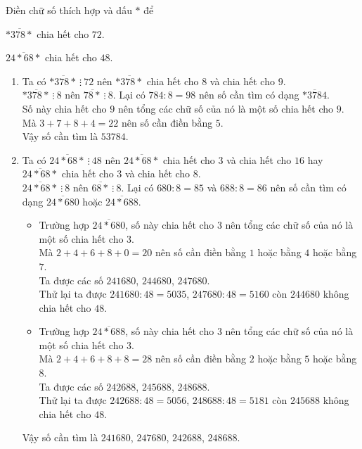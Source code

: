\begin{bt}%
 Điền chữ số thích hợp và dấu $*$ để
 \begin{enumEX}{2}
  \item $\overline{*378*}$ chia hết cho $72$.
  \item $\overline{24*68*}$ chia hết cho $48$.
 \end{enumEX}
 \loigiai
  {
  \begin{enumerate}
   \item Ta có $\overline{*378*}\ \vdots\ 72$ nên $\overline{*378*}$ chia hết cho $8$ và chia hết cho $9$.\\
   $\overline{*378*}\ \vdots\ 8$ nên $\overline{78*}\ \vdots\ 8$. Lại có $784:8=98$ nên số cần tìm có dạng $\overline{*3784}$.\\
   Số này chia hết cho $9$ nên tổng các chữ số của nó là một số chia hết cho $9$.\\
   Mà $3+7+8+4=22$ nên số cần điền bằng $5$.\\
   Vậy số cần tìm là $53784$.
   \item Ta có $\overline{24*68*}\ \vdots\ 48$ nên $\overline{24*68*}$ chia hết cho $3$ và chia hết cho $16$ hay $\overline{24*68*}$ chia hết cho $3$ và chia hết cho $8$.\\
   $\overline{24*68*}\ \vdots\ 8$ nên $\overline{68*}\ \vdots\ 8$. Lại có $680:8=85$ và $688:8=86$ nên số cần tìm có dạng $\overline{24*680}$ hoặc $\overline{24*688}$.
   \begin{itemize}
   	\item Trường hợp $\overline{24*680}$, số này chia hết cho $3$ nên tổng các chữ số của nó là một số chia hết cho $3$.\\
   	Mà $2+4+6+8+0=20$ nên số cần điền bằng $1$ hoặc bằng $4$ hoặc bằng $7$.\\
   	Ta được các số $241680$, $244680$, $247680$.\\
   	Thử lại ta được $241680:48=5035$, $247680:48=5160$ còn $244680$ không chia hết cho $48$.
   	\item Trường hợp $\overline{24*688}$, số này chia hết cho $3$ nên tổng các chữ số của nó là một số chia hết cho $3$.\\
   	Mà $2+4+6+8+8=28$ nên số cần điền bằng $2$ hoặc bằng $5$ hoặc bằng $8$.\\
   	Ta được các số $242688$, $245688$, $248688$.\\
   	Thử lại ta được $242688:48=5056$, $248688:48=5181$ còn $245688$ không chia hết cho $48$.
   \end{itemize}
   Vậy số cần tìm là $241680$, $247680$, $242688$, $248688$.
  \end{enumerate}
  }
\end{bt}

